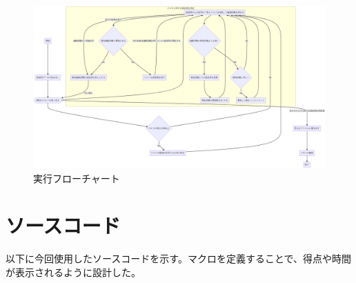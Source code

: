 \documentclass[dvipdfmx]{jsarticle}
\begin{document}
\begin{figure}[H]
  \centering
  \includegraphics[scale = 0.25]{flowchart.png}
  \caption{実行フローチャート}
\end{figure}

\section{ソースコード}

以下に今回使用したソースコードを示す。マクロを定義することで、得点や時間が表示されるように設計した。
\end{document}
